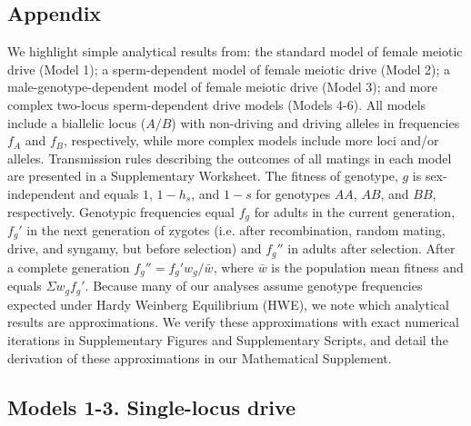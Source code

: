 \documentclass{pnastwo}
\begin{document}
\begin{article}
\section{Appendix}
We highlight simple analytical results from: 
	the standard model of female meiotic drive (Model 1); a sperm-dependent 
	model of female meiotic drive (Model 2); a male-genotype-dependent model of
	female meiotic drive (Model 3); and more complex two-locus sperm-dependent drive models (Models 4-6). 
All models include a biallelic locus ($A/B$) with non-driving and driving alleles in frequencies $f_A$ and $f_B$, 
	respectively, while more complex models include more loci and/or alleles.  
Transmission rules describing the outcomes of all matings in each
	model are presented in a Supplementary Worksheet. 
The fitness of genotype, $g$ is sex-independent and equals $1$, $1-h_s$, and $1-s$ for genotypes $AA$, $AB$, and $BB$, respectively. 
Genotypic frequencies  equal  $f_g$ for adults in the current generation, 
	$f_g'$ in the next generation of zygotes (i.e. after recombination, random mating, drive, and syngamy, but before selection)
	and $f_g''$ in adults after selection. 
After a complete generation $f_g'' = f_g' w_g/\bar{w}$, where $\bar{w}$ is the population mean fitness and equals $\Sigma w_g f_g'$. 
Because many of our analyses assume genotype frequencies expected under Hardy Weinberg Equilibrium (HWE), we note which analytical results are approximations. 
We verify these approximations with exact numerical iterations in Supplementary Figures and Supplementary Scripts, and detail the derivation of these approximations in our Mathematical Supplement. 



\subsection{Models 1-3. Single-locus drive}

\end{article}
\end{document}
